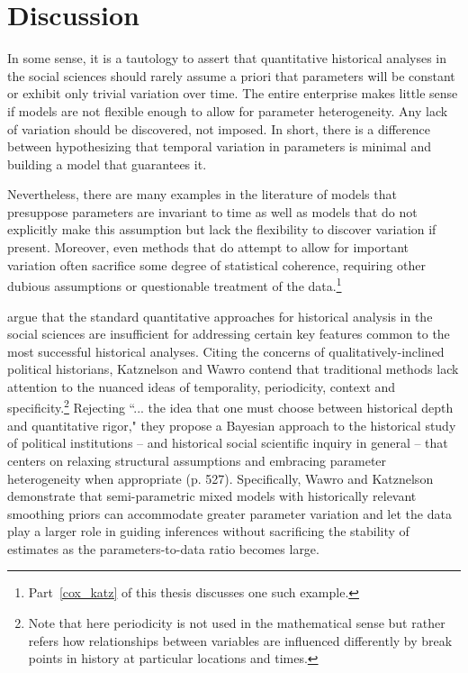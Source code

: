 \chapter{Discussion}
\label{discussion}

In some sense, it is a tautology to assert that quantitative historical analyses in the social sciences should rarely assume a priori that parameters will be constant or exhibit only trivial variation over time. The entire enterprise makes little sense if models are not flexible enough to allow for parameter heterogeneity. Any lack of variation should be discovered, not imposed. In short, there is a difference between hypothesizing that temporal variation in parameters is minimal and building a model that guarantees it. 

Nevertheless, there are many examples in the literature of models that presuppose parameters are invariant to time as well as models that do not explicitly make this assumption but lack the flexibility to discover variation if present.  Moreover, even methods that do attempt to allow for important variation often sacrifice some degree of statistical coherence, requiring other dubious assumptions or questionable treatment of the data.\footnote{Part~\ref{cox_katz} of this thesis discusses one such example.}

 argue that the standard quantitative approaches for historical analysis in the social sciences are insufficient for addressing certain key features common to the most successful historical analyses. Citing the concerns of qualitatively-inclined political historians, Katznelson and Wawro contend that traditional methods lack attention to the nuanced ideas of temporality, periodicity, context and specificity.\footnote{Note that here periodicity is not used in the mathematical sense but rather refers how relationships between variables are influenced differently by break points in history at particular locations and times.}  Rejecting ``... the idea that one must choose between historical depth and quantitative rigor," they propose a Bayesian approach to the historical study of political institutions -- and historical social scientific inquiry in general --  that centers on relaxing structural assumptions and embracing  parameter heterogeneity when appropriate (p. 527). Specifically, Wawro and Katznelson demonstrate that semi-parametric mixed models with historically relevant smoothing priors can accommodate greater parameter variation and let the data play a larger role in guiding inferences without sacrificing the stability of estimates as the parameters-to-data ratio becomes large.  

